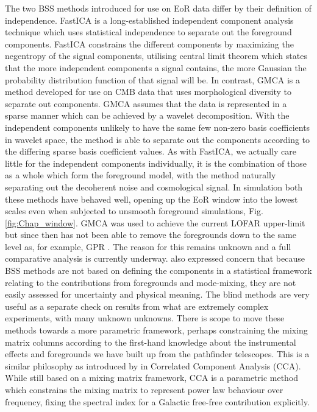 The two BSS methods introduced for use on EoR data differ by their definition of independence. FastICA \citep{Chapman2012MNRAS.423.2518C,hyvarinen2004independent,hyvarinen1999fast} is a long-established independent component analysis technique which uses statistical independence to separate out the foreground components. FastICA constrains the different components by maximizing the negentropy of the signal components, utilising central limit theorem which states that the more independent components a signal contains, the more Gaussian the probability distribution function of that signal will be. In contrast, GMCA \citep{Bobin2016A&A...591A..50B,bobin2015sparsity,Chapman2013MNRAS.429..165C,Bobin2008StMet...5..307B} is a method developed for use on CMB data that uses morphological diversity to separate out components. GMCA assumes that the data is represented in a sparse manner which can be achieved by a wavelet decomposition. With the independent components unlikely to have the same few non-zero basis coefficients in wavelet space, the method is able to separate out the components according to the differing sparse basis coefficient values. As with FastICA, we actually care little for the independent components individually, it is the combination of those as a whole which form the foreground model, with the method naturally separating out the decoherent noise and cosmological signal. In simulation both these methods have behaved well, opening up the EoR window into the lowest scales even when subjected to unsmooth foreground simulations, Fig. \ref{fig:Chap_window}. GMCA was used to achieve the current LOFAR upper-limit \citep{Patil2017ApJ...838...65P} but since then has not been able to remove the foregrounds down to the same level as, for example, GPR \citep{Mertens2018MNRAS.478.3640M}. The reason for this remains unknown and a full comparative analysis is currently underway. \citet{Mertens2018MNRAS.478.3640M} also expressed concern that because BSS methods are not based on defining the components in a statistical framework relating to the contributions from foregrounds and mode-mixing, they are not easily assessed for uncertainty and physical meaning. The blind methods are very useful as a separate check on results from what are extremely complex experiments, with many unknown unknowns. There is scope to move these methods towards a more parametric framework, perhaps constraining the mixing matrix columns according to the first-hand knowledge about the instrumental effects and foregrounds we have built up from the pathfinder telescopes. This is a similar philosophy as introduced by \citet{Bonaldi2015MNRAS.447.1973B} in Correlated Component Analysis (CCA). While still based on a mixing matrix framework, CCA is a parametric method which constrains the mixing matrix to represent power law behaviour over frequency, fixing the spectral index for a Galactic free-free contribution explicitly. 

